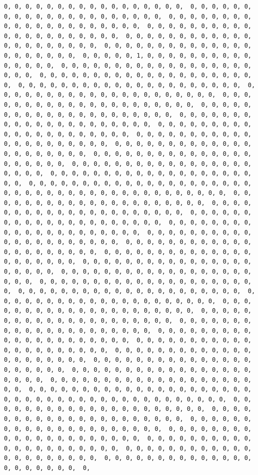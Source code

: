 \documentclass[
]{article}
\begin{document}
\begin{verbatim}
0, 0, 0, 0, 0, 0, 0, 0, 0, 0, 0, 0, 0, 0, 0, 0, 0,  0, 0, 0, 0, 0, 0, 0, 0, 0, 0, 0, 0, 0, 0, 0, 0, 0, 0, 0, 0, 0,  0, 0, 0, 0, 0, 0, 0, 0, 0, 0, 0, 0, 0, 0, 0, 0, 0, 0, 0, 0, 0,  0, 0, 0, 0, 0, 0, 0, 0, 0, 0, 0, 0, 0, 0, 0, 0, 0, 0, 0, 0, 0,  0, 0, 0, 0, 0, 0, 0, 0, 0, 0, 0, 0, 0, 0, 0, 0, 0, 0, 0, 0, 0,  0, 0, 0, 0, 0, 0, 0, 0, 0, 0, 0, 0, 0, 0, 0, 0, 0, 0, 0, 0, 0,  0, 0, 0, 0, 0, 1, 0, 0, 0, 0, 0, 0, 0, 0, 0, 0, 0, 0, 0, 0, 0,  0, 0, 0, 0, 0, 0, 0, 0, 0, 0, 0, 0, 0, 0, 0, 0, 0, 0, 0, 0, 0,  0, 0, 0, 0, 0, 0, 0, 0, 0, 0, 0, 0, 0, 0, 0, 0, 0, 0, 0, 0, 0,  0, 0, 0, 0, 0, 0, 0, 0, 0, 0, 0, 0, 0, 0, 0, 0, 0, 0, 0, 0, 0,  0, 0, 0, 0, 0, 0, 0, 0, 0, 0, 0, 0, 0, 0, 0, 0, 0, 0, 0, 0, 0,  0, 0, 0, 0, 0, 0, 0, 0, 0, 0, 0, 0, 0, 0, 0, 0, 0, 0, 0, 0, 0,  0, 0, 0, 0, 0, 0, 0, 0, 0, 0, 0, 0, 0, 0, 0, 0, 0, 0, 0, 0, 0,  0, 0, 0, 0, 0, 0, 0, 0, 0, 0, 0, 0, 0, 0, 0, 0, 0, 0, 0, 0, 0,  0, 0, 0, 0, 0, 0, 0, 0, 0, 0, 0, 0, 0, 0, 0, 0, 0, 0, 0, 0, 0,  0, 0, 0, 0, 0, 0, 0, 0, 0, 0, 0, 0, 0, 0, 0, 0, 0, 0, 0, 0, 0,  0, 0, 0, 0, 0, 0, 0, 0, 0, 0, 0, 0, 0, 0, 0, 0, 0, 0, 0, 0, 0,  0, 0, 0, 0, 0, 0, 0, 0, 0, 0, 0, 0, 0, 0, 0, 0, 0, 0, 0, 0, 0,  0, 0, 0, 0, 0, 0, 0, 0, 0, 0, 0, 0, 0, 0, 0, 0, 0, 0, 0, 0, 0,  0, 0, 0, 0, 0, 0, 0, 0, 0, 0, 0, 0, 0, 0, 0, 0, 0, 0, 0, 0, 0,  0, 0, 0, 0, 0, 0, 0, 0, 0, 0, 0, 0, 0, 0, 0, 0, 0, 0, 0, 0, 0,  0, 0, 0, 0, 0, 0, 0, 0, 0, 0, 0, 0, 0, 0, 0, 0, 0, 0, 0, 0, 0,  0, 0, 0, 0, 0, 0, 0, 0, 0, 0, 0, 0, 0, 0, 0, 0, 0, 0, 0, 0, 0,  0, 0, 0, 0, 0, 0, 0, 0, 0, 0, 0, 0, 0, 0, 0, 0, 0, 0, 0, 0, 0,  0, 0, 0, 0, 0, 0, 0, 0, 0, 0, 0, 0, 0, 0, 0, 0, 0, 0, 0, 0, 0,  0, 0, 0, 0, 0, 0, 0, 0, 0, 0, 0, 0, 0, 0, 0, 0, 0, 0, 0, 0, 0,  0, 0, 0, 0, 0, 0, 0, 0, 0, 0, 0, 0, 0, 0, 0, 0, 0, 0, 0, 0, 0,  0, 0, 0, 0, 0, 0, 0, 0, 0, 0, 0, 0, 0, 0, 0, 0, 0, 0, 0, 0, 0,  0, 0, 0, 0, 0, 0, 0, 0, 0, 0, 0, 0, 0, 0, 0, 0, 0, 0, 0, 0, 0,  0, 0, 0, 0, 0, 0, 0, 0, 0, 0, 0, 0, 0, 0, 0, 0, 0, 0, 0, 0, 0,  0, 0, 0, 0, 0, 0, 0, 0, 0, 0, 0, 0, 0, 0, 0, 0, 0, 0, 0, 0, 0,  0, 0, 0, 0, 0, 0, 0, 0, 0, 0, 0, 0, 0, 0, 0, 0, 0, 0, 0, 0, 0,  0, 0, 0, 0, 0, 0, 0, 0, 0, 0, 0, 0, 0, 0, 0, 0, 0, 0, 0, 0, 0,  0, 0, 0, 0, 0, 0, 0, 0, 0, 0, 0, 0, 0, 0, 0, 0, 0, 0, 0, 0, 0,  0, 0, 0, 0, 0, 0, 0, 0, 0, 0, 0, 0, 0, 0, 0, 0, 0, 0, 0, 0, 0,  0, 0, 0, 0, 0, 0, 0, 0, 0, 0, 0, 0, 0, 0, 0, 0, 0, 0, 0, 0, 0,  0, 0, 0, 0, 0, 0, 0, 0, 0, 0, 0, 0, 0, 0, 0, 0, 0, 0, 0, 0, 0,  0, 0, 0, 0, 0, 0, 0, 0, 0, 0, 0, 0, 0, 0, 0, 0, 0, 0, 0, 0, 0,  0, 0, 0, 0, 0, 0, 0, 0, 0, 0, 0, 0, 0, 0, 0, 0, 0, 0, 0, 0, 0,  0, 0, 0, 0, 0, 0, 0, 0, 0, 0, 0, 0, 0, 0, 0, 0, 0, 0, 0, 0, 0,  0, 0, 0, 0, 0, 0, 0, 0, 0, 0, 0, 0, 0, 0, 0, 0, 0, 0, 0, 0, 0,  0, 0, 0, 0, 0, 0, 0, 0, 0, 0, 0, 0, 0, 0, 0, 0, 0, 0, 0, 0, 0,  0, 0, 0, 0, 0, 0, 0, 0, 0, 0, 0, 0, 0, 0, 0, 0, 0, 0, 0, 0, 0,  0, 0, 0, 0, 0, 0, 0, 0, 0, 0, 0, 0, 0, 0, 0, 0, 0, 0, 0, 0, 0,  0, 0, 0, 0, 0, 0, 0, 0, 0, 0, 0, 0, 0, 0, 0, 0, 0, 0, 0, 0, 0,  0, 0, 0, 0, 0, 0, 0, 0, 0, 0, 0, 0, 0, 0, 0, 0, 0, 0, 0, 0, 0,  0, 0, 0, 0, 0, 0, 0, 0, 0, 0, 0, 0, 0, 0, 0, 0, 0, 0, 0, 0, 0,  0, 0, 0, 0, 0, 0, 0, 0, 0, 0, 0, 0, 0, 0, 0, 0, 0, 0, 0, 0, 0,  0, 0, 0, 0, 0, 0, 0, 0, 0, 0, 0, 0, 0, 0, 0, 0, 0, 0, 0, 0, 0,  0, 0, 0, 0, 0, 0, 0, 0, 0, 0, 0, 0, 0, 0, 0, 0, 0, 0, 0, 0, 0,  0, 0, 0, 0, 0, 0, 0, 0, 0, 0, 0, 0, 0, 0, 0, 0, 0, 0, 0, 0, 0,  0, 0, 0, 0, 0, 0, 0, 0, 0, 0, 0, 0, 0, 0, 0, 0, 0, 0, 0, 0, 0,  0, 
\end{verbatim}
\end{document}
